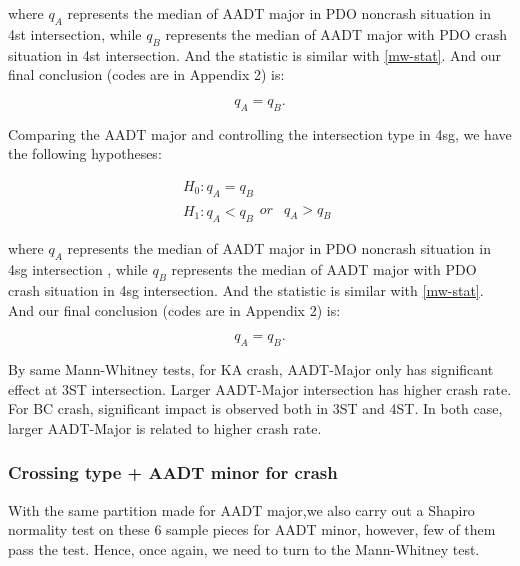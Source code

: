 \documentclass[11pt]{scrartcl} %
\begin{document}
where $q_A$ represents the median of AADT major in PDO noncrash situation in 4st intersection, while $q_B$ represents the median of AADT major with PDO crash situation in 4st intersection. And the statistic is similar with \eqref{mw-stat}. And our final conclusion (codes are in Appendix 2) is:

\begin{equation*}
{q_A} = {q_B}.
\end{equation*}

\par

Comparing the AADT major and controlling the intersection type in 4sg, we have the following hypotheses:

\begin{equation*}
\begin{array}{l}
{H_0}:{q_A} = {q_B}\\
{H_1}:{q_A} < {q_B}\begin{array}{*{20}{c}}
{or}&{{q_A} > {q_B}}
\end{array}
\end{array}
\end{equation*}

where $q_A$ represents the median of AADT major in PDO noncrash situation in 4sg intersection , while $q_B$ represents the median of AADT major with PDO crash situation in 4sg intersection. And the statistic is similar with \eqref{mw-stat}. And our final conclusion (codes are in Appendix 2) is:

\begin{equation*}
{q_A} = {q_B}.
\end{equation*}

By same Mann-Whitney tests, for KA crash, AADT-Major only has significant effect at 3ST intersection. Larger AADT-Major intersection has higher crash rate. For BC crash, significant impact is observed both in 3ST and 4ST. In both case, larger AADT-Major is related to higher crash rate.

\subsubsection{Crossing type + AADT minor for crash}

With the same partition made for AADT major,we also carry out a Shapiro normality test on these 6 sample pieces for AADT minor, however, few of them pass the test. Hence, once again, we need to turn to the Mann-Whitney test.

\par
\end{document}

